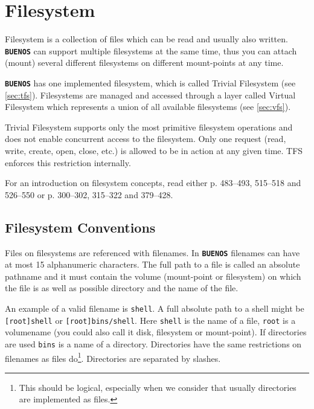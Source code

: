 \documentclass[twoside,a4paper]{report}
\newcommand{\buenos}{\texttt{\textbf{BUENOS}}}
\begin{document}
\chapter{Filesystem}
\label{sec:fs}


Filesystem is a collection of files which can be read and usually
also written. \buenos{} can support multiple filesystems at the same time,
thus you can attach (mount) several different filesystems on different
mount-points at any time. 

\buenos{} has one implemented filesystem, which is called Trivial
Filesystem (see \autoref{sec:tfs}). Filesystems are managed and
accessed through a layer called Virtual Filesystem which represents a
union of all available filesystems (see \autoref{sec:vfs}).

Trivial Filesystem supports only the most primitive filesystem
operations and does not enable concurrent access to the filesystem.
Only one request (read, write, create, open, close, etc.) is allowed
to be in action at any given time. TFS enforces this restriction
internally.

For an introduction on filesystem concepts, read either
\cite{stallings} p. 483--493, 515--518 and 526--550 or \cite{tanenbaum}
p. 300--302, 315--322 and 379--428.

\section{Filesystem Conventions}
\label{sec:fsconventions}


Files on filesystems are referenced with filenames. In \buenos{}
filenames can have at most 15 alphanumeric characters. The full path
to a file is called an absolute pathname and it must contain the
volume (mount-point or filesystem) on which the file is as well as
possible directory and the name of the file. 

An example of a valid filename is \texttt{shell}. A full absolute path
to a shell might be \texttt{[root]shell} or \texttt{[root]bins/shell}.
Here \texttt{shell} is the name of a file, \texttt{root} is a
volumename (you could also call it disk, filesystem or mount-point).
If directories are used \texttt{bins} is a name of a directory.
Directories have the same restrictions on filenames as files
do\footnote{This should be logical, especially when we consider that
usually directories are implemented as files.}. Directories are
separated by slashes.
\end{document}
